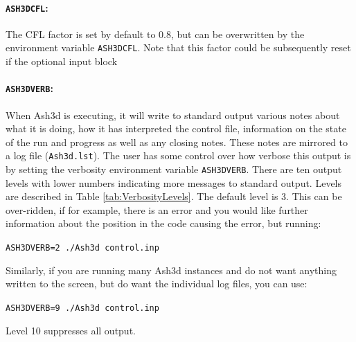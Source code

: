 \paragraph{\texttt{ASH3DCFL}:} The CFL factor
is set by default to 0.8, but can be overwritten by the environment variable \texttt{ASH3DCFL}.
Note that this factor could be subsequently reset if the optional input block

\paragraph{\texttt{ASH3DVERB}:} When Ash3d is executing, it will write to standard output
various notes about what it is doing, how it has interpreted the control file, information
on the state of the run and progress as well as any closing notes. These notes are mirrored
to a log file (\texttt{Ash3d.lst}). The user has some control over how verbose this output
is by setting the verbosity environment variable \texttt{ASH3DVERB}. There are ten output
levels with lower numbers indicating more messages to standard output. Levels are described
in Table \ref{tab:VerbosityLevels}. The default level is 3. This can be over-ridden, if
for example, there is an error and you would like further information about the position in
the code causing the error, but running:

\texttt{ASH3DVERB=2 ./Ash3d control.inp}

Similarly, if you are running many Ash3d instances and do not want anything written to the
screen, but do want the individual log files, you can use:

\texttt{ASH3DVERB=9 ./Ash3d control.inp}

Level 10 suppresses all output.

